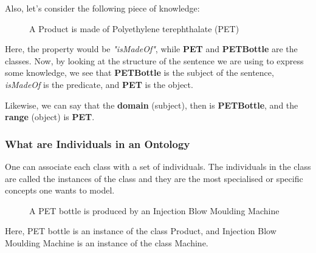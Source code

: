 \documentclass{guideline/sty/rapport}
\begin{document}
Also, let's consider the following piece of knowledge:
 \begin{SampleEnv}
    \begin{figure}[H]
    \begin{mdframed}[backgroundcolor=mediumtealblue!8, linecolor=mediumtealblue]
        \begin{minipage}[t]{1\linewidth}
        A Product is made of Polyethylene terephthalate (PET)
    \end{minipage}
     \end{mdframed}
    \end{figure}
    \label{fig:exampleDomainRange}
    \end{SampleEnv}

Here, the property would be \textit{"isMadeOf"}, while \textbf{PET} and \textbf{PETBottle} are the classes. Now, by looking at the structure of the sentence we are using to express some knowledge, we see that \textbf{PETBottle} is the subject of the sentence, \textit{isMadeOf} is the predicate, and \textbf{PET} is the object. \singlespacing

Likewise, we can say that the \textbf{domain} (subject), then is \textbf{PETBottle}, and the \textbf{range} (object) is \textbf{PET}.


\subsubsection{What are Individuals in an Ontology}
\label{sec:individualsontologies}

One can associate each class with a set of individuals. The individuals in the class are called the instances of the class and they are the most specialised or specific concepts one wants to model. \singlespacing

 \begin{SampleEnv}
    \begin{figure}[H]
    \begin{mdframed}[backgroundcolor=mediumtealblue!8, linecolor=mediumtealblue]
        \begin{minipage}[t]{1\linewidth}
        A PET bottle is produced by an Injection Blow Moulding Machine
    \end{minipage}
     \end{mdframed}
    \end{figure}
    \label{fig:exampleIndividuals}
    \end{SampleEnv}
    
Here, PET bottle is an instance of the class Product, and Injection Blow Moulding Machine is an instance of the class Machine. \singlespacing
\end{document}
